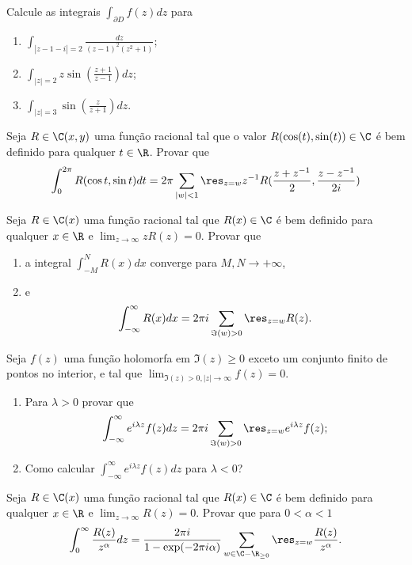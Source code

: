 \begin{problema}
Calcule as integrais $\int_{\partial D} f(z) dz$ para
\begin{enumerate}
\item $\int_{|z-1-i|=2} \frac{dz}{(z-1)^2 (z^2+1)}$;
\item $\int_{|z|=2} z \sin(\frac{z+1}{z-1}) dz$;
\item $\int_{|z|=3} \sin(\frac{z}{z+1}) dz$.
\end{enumerate}
\end{problema}


\begin{problema}
Seja $R \in \C(x,y)$ uma função racional tal que o valor $R(\cos(t),\sin(t))\in\C$ é bem definido
para qualquer $t\in\R$. Provar que
\[ \int_0^{2\pi} R(\cos t,\sin t) dt 
 = 2\pi \sum_{|w|<1} \res_{z=w} z^{-1} R(\frac{z+z^{-1}}{2},\frac{z-z^{-1}}{2i}) \]
\end{problema}

\begin{problema}
Seja $R \in \C(x)$ uma função racional tal que $R(x)\in\C$ é bem definido para qualquer $x\in\R$
e $\lim_{z\to\infty} zR(z) = 0$. Provar que
\begin{enumerate}
\item a integral $\int_{-M}^N R(x) dx$
converge para $M,N\to+\infty$,
\item  e \[ \int_{-\infty}^\infty R(x) dx = 2\pi i \sum_{\Im(w)>0} \res_{z=w} R(z). \]
\end{enumerate}
\end{problema}

\begin{problema}
Seja $f(z)$ uma função holomorfa em $\Im(z)\geq 0$ exceto um conjunto finito de pontos no interior,
e tal que $\lim_{\Im(z)>0, |z|\to\infty} f(z) = 0$.
\begin{enumerate}
\item Para $\lambda>0$ provar que
\[ \int_{-\infty}^\infty e^{i\lambda z} f(z) dz = 2\pi i \sum_{\Im(w)>0} \res_{z=w} e^{i\lambda z} f(z); \]
\item Como calcular $\int_{-\infty}^\infty e^{i\lambda z} f(z) dz$ para $\lambda<0$?
\end{enumerate}
\end{problema}

\begin{problema}
Seja $R \in \C(x)$ uma função racional tal que $R(x)\in\C$ é bem definido para qualquer $x\in\R$
e $\lim_{z\to\infty} R(z) = 0$. Provar que para $0<\alpha<1$
\[ \int_{0}^\infty \frac{R(z)}{z^\alpha} dz 
 = \frac{2\pi i}{1-\exp(-2\pi i\alpha)} \sum_{w\in\C-\R_{\geq0}} \res_{z=w} \frac{R(z)}{z^\alpha}. \]
\end{problema}

